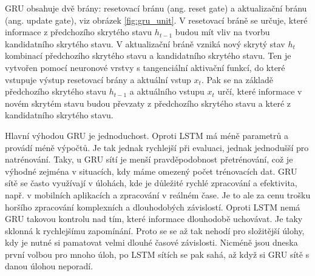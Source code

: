 GRU obsahuje dvě brány: resetovací bránu (ang. reset gate) a aktualizační bránu
(ang. update gate), viz obrázek \ref{fig:gru_unit}. V resetovací bráně se určuje, které informace z předchozího
skrytého stavu $h_{t-1}$ budou mít vliv na tvorbu kandidatního skrytého stavu.
V aktualizační bráně vzniká nový skrytý stav $h_t$ kombinací předchozího
skrytého stavu a kandidatního skrytého stavu. Ten je vytvořen pomocí neuronové
vrstvy s tangenciální aktivační funkcí, do které vstupuje výstup resetovací
brány a aktuální vstup $x_t$. Pak se na základě předchozího skrytého stavu
$h_{t-1}$ a aktuálního vstupu $x_t$ určí, které informace v novém skrytém stavu
budou převzaty z předchozího skrytého stavu a které z kandidatního skrytého
stavu.

Hlavní výhodou GRU je jednoduchost. Oproti LSTM má méně parametrů a provádí
méně výpočtů. Je tak jednak rychlejší při evaluaci, jednak jednodušší pro
natrénování. Taky, u GRU sítí je menší pravděpodobnost přetrénování, což je
výhodné zejména v situacích, kdy máme omezený počet trénovacích dat. GRU sítě
se často využívají v úlohách, kde je důležité rychlé zpracování a efektivita,
např. v mobilních aplikacích a zpracování v reálném čase. Je to ale za cenu
trošku horšího zpracování komplexních a dlouhodobých závislostí. Oproti LSTM
nemá GRU takovou kontrolu nad tím, které informace dlouhodobě uchovávat. Je
taky sklonná k rychlejšímu zapomínání. Proto se se až tak nehodí pro složitější
úlohy, kdy je nutné si pamatovat velmi dlouhé časové závislosti. Nicméně jsou
dneska první volbou pro mnoho úloh, po LSTM sítích se pak sahá, až když si GRU
sítě s danou úlohou neporadí.


\endinput